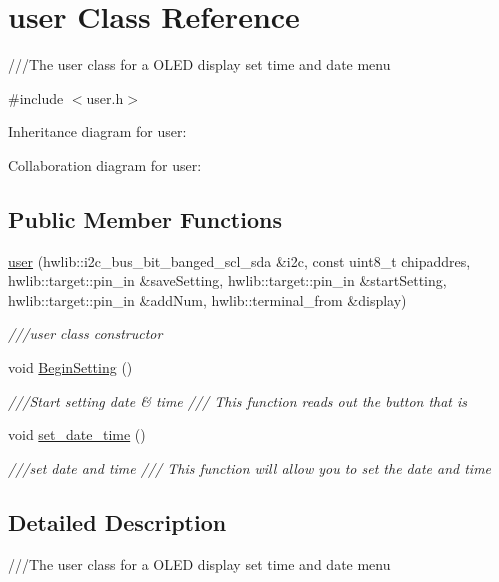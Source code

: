 \hypertarget{classuser}{}\section{user Class Reference}
\label{classuser}


///\+The user class for a O\+L\+ED display set time and date menu  




{\ttfamily \#include $<$user.\+h$>$}



Inheritance diagram for user\+:


Collaboration diagram for user\+:
\subsection*{Public Member Functions}
\begin{DoxyCompactItemize}
\item 
\hyperlink{classuser_a140937f8c81560822a5fc64cfefffcac}{user} (hwlib\+::i2c\+\_\+bus\+\_\+bit\+\_\+banged\+\_\+scl\+\_\+sda \&i2c, const uint8\+\_\+t chipaddres, hwlib\+::target\+::pin\+\_\+in \&save\+Setting, hwlib\+::target\+::pin\+\_\+in \&start\+Setting, hwlib\+::target\+::pin\+\_\+in \&add\+Num, hwlib\+::terminal\+\_\+from \&display)
\begin{DoxyCompactList}\small\item\em ///user class constructor \end{DoxyCompactList}\item 
void \hyperlink{classuser_af17199133dfce25d87d53e716da3c65b}{Begin\+Setting} ()
\begin{DoxyCompactList}\small\item\em ///\+Start setting date \& time  /// This function reads out the button that is \end{DoxyCompactList}\item 
void \hyperlink{classuser_ae8ad51951cea1b9675c243bc63c3e7aa}{set\+\_\+date\+\_\+time} ()
\begin{DoxyCompactList}\small\item\em ///set date and time  /// This function will allow you to set the date and time \end{DoxyCompactList}\end{DoxyCompactItemize}


\subsection{Detailed Description}
///\+The user class for a O\+L\+ED display set time and date menu 

